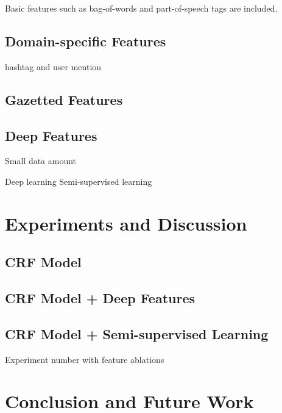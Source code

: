 \documentclass[11pt]{article}
\begin{document}
Basic features such as bag-of-words and part-of-speech tags are included.

\subsection{Domain-specific Features}
hashtag and user mention

\subsection{Gazetted Features}

\subsection{Deep Features}

Small data amount

Deep learning
Semi-supervised learning



\section{Experiments and Discussion}
\label{sec:experiment}

\subsection{CRF Model}
\subsection{CRF Model + Deep Features}
\subsection{CRF Model + Semi-supervised Learning}


Experiment number with feature ablations


\section{Conclusion and Future Work}
\label{sec:conclusion}




\end{document}
